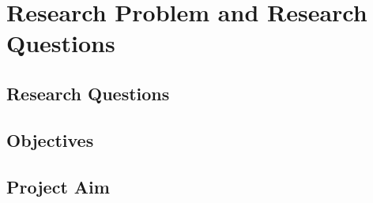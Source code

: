 \section{Research Problem and Research Questions}

\subsection{Research Questions}
\subsection{Objectives}
\subsection{Project Aim}

